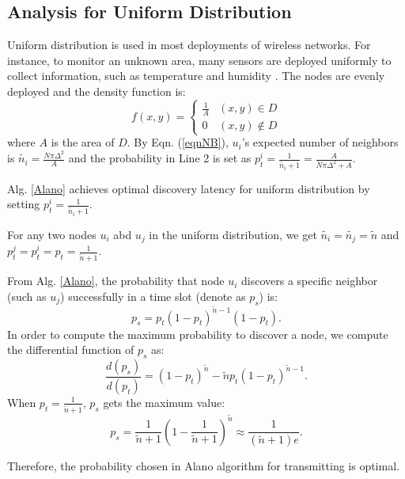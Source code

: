 \subsection{Analysis for Uniform Distribution}
\label{uniform}
Uniform distribution is used in most deployments of wireless networks.
For instance, to monitor an unknown area, many sensors are deployed
uniformly to collect information, such as temperature and humidity
\cite{flammini2007real}. The nodes are evenly deployed and the density
function is:
$$f(x,y)=
\begin{cases}
\frac{1}{A}& (x,y)\in D\\
0& (x,y)\notin D
\end{cases}$$
where $A$ is the area of $D$.
By Eqn. (\ref{eqnNB}), $u_i$'s expected number of neighbors is $\widetilde{n_i} = \frac{N\pi \Delta^2}{A}$ and the probability in Line 2 is set as $p_t^i = \frac{1}{\widetilde{n_i}+1}=\frac{A}{N\pi \Delta^2+A}$. 
\begin{lemma}
Alg. \ref{Alano} achieves optimal discovery latency for uniform distribution by setting $p_t^i = \frac{1}{\widetilde{n_i}+1}$.
\end{lemma}
\begin{IEEEproof}
For any two nodes $u_i$ abd $u_j$ in the uniform distribution, we get $\widetilde{n_i} = \widetilde{n_j} = \widetilde{n}$ and $p_t^j = p_t^ i = p_t = \frac{1}{\widetilde{n}+1}$.


From Alg. \ref{Alano}, the probability that node $u_i$ discovers a specific neighbor (such as $u_j$) successfully in a time slot (denote as $p_s$) is:
$$
p_s = p_t{(1-p_t)}^{\widetilde{n}-1}(1-p_t).
$$
In order to compute the maximum probability to discover a node, we compute the differential function of $p_s$ as:
$$
\frac{d(p_s)}{d(p_t)} = {(1-p_t)}^{\widetilde{n}}-\widetilde{n}p_t{(1-p_t)}^{\widetilde{n}-1}.
$$
When $p_t=\frac{1}{\widetilde{n}+1}$, $p_s$ gets the maximum value:
$$p_s = \frac{1}{\widetilde{n}+1}{(1-\frac{1}{\widetilde{n}+1})}^{\widetilde{n}} \approx \frac{1}{(\widetilde{n}+1)e}.$$

Therefore, the probability chosen in Alano algorithm for transmitting is optimal.
\end{IEEEproof}



